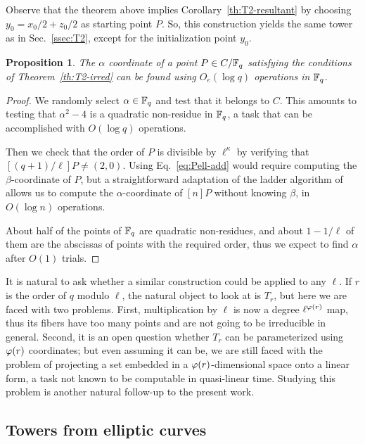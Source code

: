 \documentclass{sig-alternate}
\newtheorem{proposition}[definition]{Proposition}
\begin{document}
Observe that the theorem above implies Corollary~\ref{th:T2-resultant}
by choosing $y_0 = x_0/2+z_0/2$ as starting point $P$. So, this
construction yields the same tower as in Sec.~\ref{ssec:T2}, except
for the initialization point $y_0$.

\begin{proposition}
  The $\alpha$ coordinate of a point $P\in C/\mathbb{F}_q$ satisfying the
  conditions of Theorem~\ref{th:T2-irred} can be found using $O_e(\log
  q)$ operations in $\mathbb{F}_q$.
\end{proposition}
\begin{proof}
  We randomly select $\alpha\in\mathbb{F}_q$ and test that it belongs to
  $C$. This amounts to testing that $\alpha^2-4$ is a quadratic
  non-residue in $\mathbb{F}_q$, a task that can be accomplished with $O(\log
  q)$ operations.

  Then we check that the order of $P$ is divisible by $\ell^\kappa$ by
  verifying that $[(q+1)/\ell]P\ne (2,0)$. Using
  Eq.~\eqref{eq:Pell-add} would require computing the
  $\beta$-coordinate of $P$, but a straightforward adaptation of the
  ladder algorithm of~\cite{montgomery} allows us to compute the
  $\alpha$-coordinate of $[n]P$ without knowing $\beta$, in $O(\log
  n)$ operations.

  About half of the points of $\mathbb{F}_q$ are quadratic non-residues, and
  about $1-1/\ell$ of them are the abscissas of points with the
  required order, thus we expect to find $\alpha$ after $O(1)$ trials.
\end{proof}

It is natural to ask whether a similar construction could be applied
to any $\ell$. If $r$ is the order of $q$ modulo $\ell$, the natural
object to look at is $T_r$, but here we are faced with two
problems. First, multiplication by $\ell$ is now a degree
$\ell^{\varphi(r)}$ map, thus its fibers have too many points and are
not going to be irreducible in general. Second, it is an open question
whether $T_r$ can be parameterized using $\varphi(r)$ coordinates; but
even assuming it can be, we are still faced with the problem of
projecting a set embedded in a $\varphi(r)$-dimensional space onto a
linear form, a task not known to be computable in quasi-linear
time. Studying this problem is another natural follow-up to the
present work.


\subsection{Towers from elliptic curves}
\end{document}
